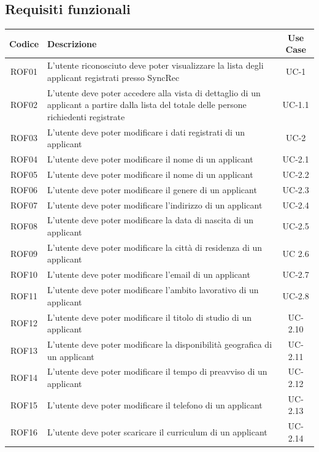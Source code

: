\subsection{Requisiti funzionali}
\begin{center}
	\begin{tabularx}{\textwidth}{|c|X|c|}
		\hline
		\textbf{Codice} & \textbf{Descrizione} & \textbf{Use Case} \\
		\hline
		\endhead
		ROF01 & L'utente riconosciuto deve poter visualizzare la lista degli applicant registrati presso SyncRec & UC-1 \\
		\hline
		ROF02 & L'utente deve poter accedere alla vista di dettaglio di un applicant a partire dalla lista del totale delle persone richiedenti registrate & UC-1.1 \\
		\hline
		ROF03 & L'utente deve poter modificare i dati registrati di un applicant & UC-2 \\
		\hline
		ROF04 & L'utente deve poter modificare il nome di un applicant & UC-2.1 \\
		\hline
		ROF05 & L'utente deve poter modificare il nome di un applicant & UC-2.2 \\
		\hline
		ROF06 & L'utente deve poter modificare il genere di un applicant & UC-2.3\\
		\hline
		ROF07 & L'utente deve poter modificare l'indirizzo di un applicant & UC-2.4 \\
		\hline
		ROF08 &  L'utente deve poter modificare la data di nascita di un applicant & UC-2.5 \\
		\hline
		ROF09 & L'utente deve poter modificare la città di residenza di un applicant & UC 2.6 \\
		\hline
		ROF10 & L'utente deve poter modificare l'email di un applicant & UC-2.7\\
		\hline
		ROF11 & L'utente deve poter modificare l'ambito lavorativo di un applicant &  UC-2.8\\
		\hline
		ROF12 & L'utente deve poter modificare il titolo di studio di un applicant & UC-2.10 \\
		\hline
		ROF13 & L'utente deve poter modificare la disponibilità geografica di un applicant & UC-2.11\\
		\hline
		ROF14 & L'utente deve poter modificare il tempo di preavviso di un applicant & UC-2.12\\
		\hline
		ROF15 & L'utente deve poter modificare il telefono di un applicant & UC-2.13 \\
		\hline
		ROF16 & L'utente deve poter scaricare il curriculum di un applicant & UC-2.14\\

\end{tabularx}
\end{center}
